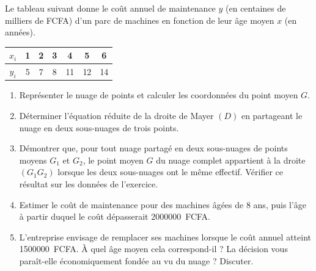 \documentclass[11pt]{article}
\begin{document}
\begin{exercice}
Le tableau suivant donne le coût annuel de maintenance $y$ (en centaines de milliers de FCFA) d'un parc de machines en fonction de leur âge moyen $x$ (en années).

\begin{center}
\begin{tabular}{|c|c|c|c|c|c|c|}
\hline
$x_i$ & 1 & 2 & 3 & 4 & 5 & 6 \\
\hline
$y_i$ & 5 & 7 & 8 & 11 & 12 & 14 \\
\hline
\end{tabular}
\end{center}

\begin{enumerate}
\item Représenter le nuage de points et calculer les coordonnées du point moyen $G$.
\item Déterminer l'équation réduite de la droite de Mayer $(D)$ en partageant le nuage en deux sous-nuages de trois points.
\item Démontrer que, pour tout nuage partagé en deux sous-nuages de points moyens $G_1$ et $G_2$, le point moyen $G$ du nuage complet appartient à la droite $(G_1G_2)$ lorsque les deux sous-nuages ont le même effectif. Vérifier ce résultat sur les données de l'exercice.
\item Estimer le coût de maintenance pour des machines âgées de $8$ ans, puis l'âge à partir duquel le coût dépasserait \SI{2000000}{FCFA}.
\item L'entreprise envisage de remplacer ses machines lorsque le coût annuel atteint \SI{1500000}{FCFA}. À quel âge moyen cela correspond-il ? La décision vous paraît-elle économiquement fondée au vu du nuage ? Discuter.
\end{enumerate}
\end{exercice}
\end{document}
